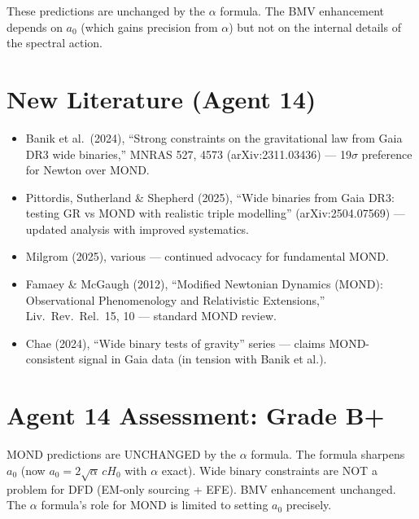 \documentclass[11pt,a4paper]{article}
\begin{document}
These predictions are unchanged by the $\alpha$ formula. The BMV enhancement depends on $a_0$ (which gains precision from $\alpha$) but not on the internal details of the spectral action.

\section{New Literature (Agent 14)}

\begin{itemize}
\item Banik et al.\ (2024), ``Strong constraints on the gravitational law from Gaia DR3 wide binaries,'' MNRAS 527, 4573 (arXiv:2311.03436) --- 19$\sigma$ preference for Newton over MOND.
\item Pittordis, Sutherland \& Shepherd (2025), ``Wide binaries from Gaia DR3: testing GR vs MOND with realistic triple modelling'' (arXiv:2504.07569) --- updated analysis with improved systematics.
\item Milgrom (2025), various --- continued advocacy for fundamental MOND.
\item Famaey \& McGaugh (2012), ``Modified Newtonian Dynamics (MOND): Observational Phenomenology and Relativistic Extensions,'' Liv.\ Rev.\ Rel.\ 15, 10 --- standard MOND review.
\item Chae (2024), ``Wide binary tests of gravity'' series --- claims MOND-consistent signal in Gaia data (in tension with Banik et al.).
\end{itemize}

\section{Agent 14 Assessment: Grade B+}

MOND predictions are UNCHANGED by the $\alpha$ formula. The formula sharpens $a_0$ (now $a_0 = 2\sqrt{\alpha}\,cH_0$ with $\alpha$ exact). Wide binary constraints are NOT a problem for DFD (EM-only sourcing + EFE). BMV enhancement unchanged. The $\alpha$ formula's role for MOND is limited to setting $a_0$ precisely.
\end{document}
